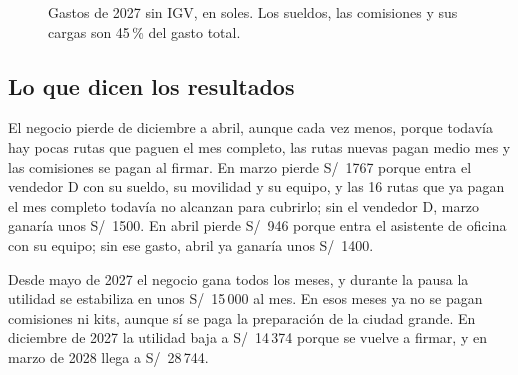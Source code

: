 \documentclass[10.5pt,a4paper]{article}
\begin{document}
\begin{figure}[H]
\caption{Gastos de 2027 sin IGV, en soles. Los sueldos, las comisiones y sus cargas son 45\,\% del gasto total.}
\end{figure}

\subsection{Lo que dicen los resultados}

El negocio pierde de diciembre a abril, aunque cada vez menos, porque todavía hay pocas rutas que paguen el mes completo, las rutas nuevas pagan medio mes y las comisiones se pagan al firmar. En marzo pierde S/~1767 porque entra el vendedor D con su sueldo, su movilidad y su equipo, y las 16 rutas que ya pagan el mes completo todavía no alcanzan para cubrirlo; sin el vendedor D, marzo ganaría unos S/~1500. En abril pierde S/~946 porque entra el asistente de oficina con su equipo; sin ese gasto, abril ya ganaría unos S/~1400.

Desde mayo de 2027 el negocio gana todos los meses, y durante la pausa la utilidad se estabiliza en unos S/~15\,000 al mes. En esos meses ya no se pagan comisiones ni kits, aunque sí se paga la preparación de la ciudad grande. En diciembre de 2027 la utilidad baja a S/~14\,374 porque se vuelve a firmar, y en marzo de 2028 llega a S/~28\,744.
\end{document}
